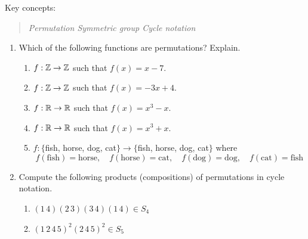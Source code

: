   
\begin{exercises}
	Key concepts:
	\begin{quote}
		\emph{Permutation \qquad Symmetric group \qquad Cycle notation}
	\end{quote}
	
	\begin{enumerate}
	  \item Which of the following functions are permutations? Explain.
	  \begin{enumerate}
	      \item $f:\mathbb{Z}\to\mathbb{Z}$ such that $f(x)=x-7$.
	      \item $f:\mathbb{Z}\to\mathbb{Z}$ such that $f(x)=-3x+4$.
	      \item $f:\mathbb{R}\to\mathbb{R}$ such that $f(x)=x^3-x$.
	      \item $f:\mathbb{R}\to\mathbb{R}$ such that $f(x)=x^3+x$.
	      \item $f:\{$fish, horse, dog, cat$\}\to\{$fish, horse, dog, cat$\}$ where 
	      \[
	      	f(\text{fish})=\text{horse},\quad f(\text{horse})=\text{cat},\quad f(\text{dog})=\text{dog},\quad f(\text{cat})=\text{fish}
	      \]
	  \end{enumerate}
	    
	  
	  \item Compute the following products (compositions) of permutations in cycle notation.
	  \begin{enumerate}
	    \item {}\lstsp $(1\,4)(2\,3)(3\,4)(1\,4)\in S_4$
	    \setcounter{enumii}{2}
	    \item {}\lstsp $(1\,2\,4\,5)^2(2\,4\,5)^2\in S_5$
	  \end{enumerate}
	  
	  \goodbreak
	  

\end{enumerate}
\end{exercises}
